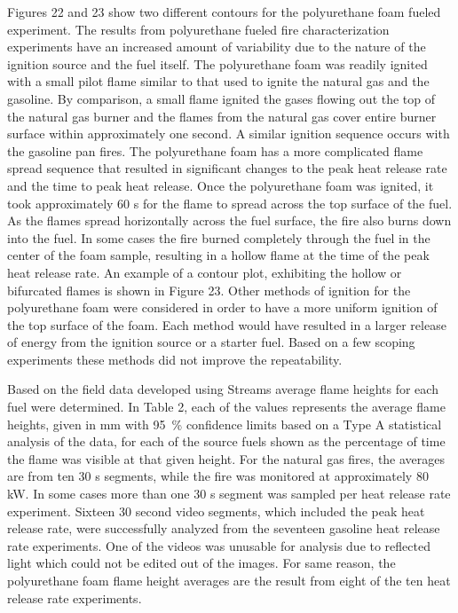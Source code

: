 \documentclass[twoside]{uocthesis}
\begin{document}
{Figures 22 and 23 show two different contours for the polyurethane foam fueled experiment.  The results from polyurethane fueled fire characterization experiments have an increased amount of variability due to the nature of the ignition source and the fuel itself.  The polyurethane foam was readily ignited with a small pilot flame similar to that used to ignite the natural gas and the gasoline.  By comparison, a small flame ignited the gases flowing out the top of the natural gas burner and the flames from the natural gas cover entire burner surface within approximately one second.  A similar ignition sequence occurs with the gasoline pan fires. The polyurethane foam has a more complicated flame spread sequence that resulted in significant changes to the peak heat release rate and the time to peak heat release.  Once the polyurethane foam was ignited, it took approximately 60 s for the flame to spread across the top surface of the fuel.  As the flames spread horizontally across the fuel surface, the fire also burns down into the fuel.  In some cases the fire burned completely through the fuel in the center of the foam sample, resulting in a hollow flame at the time of the peak heat release rate.  An example of a contour plot, exhibiting the hollow or bifurcated flames is shown in Figure 23.  Other methods of ignition for the polyurethane foam were considered in order to have a more uniform ignition of the top surface of the foam.  Each method would have resulted in a larger release of energy from the ignition source or a starter fuel.   Based on a few scoping experiments these methods did not improve the repeatability.

Based on the field data developed using Streams average flame heights for each fuel were determined.  In Table 2, each of the values represents the average flame heights, given in mm with 95~\% confidence limits based on a Type A statistical analysis of the data, for each of the source fuels shown as the percentage of time the flame was visible at that given height.  For the natural gas fires, the averages are from ten 30 s segments, while the fire was monitored at approximately 80 kW.  In some cases more than one 30 s segment was sampled per heat release rate experiment.  Sixteen 30 second video segments, which included the peak heat release rate, were successfully analyzed from the seventeen gasoline heat release rate experiments.  One of the videos was unusable for analysis due to reflected light which could not be edited out of the images.  For same reason, the polyurethane foam flame height averages are the result from eight of the ten heat release rate experiments.  
 
}
\end{document}
